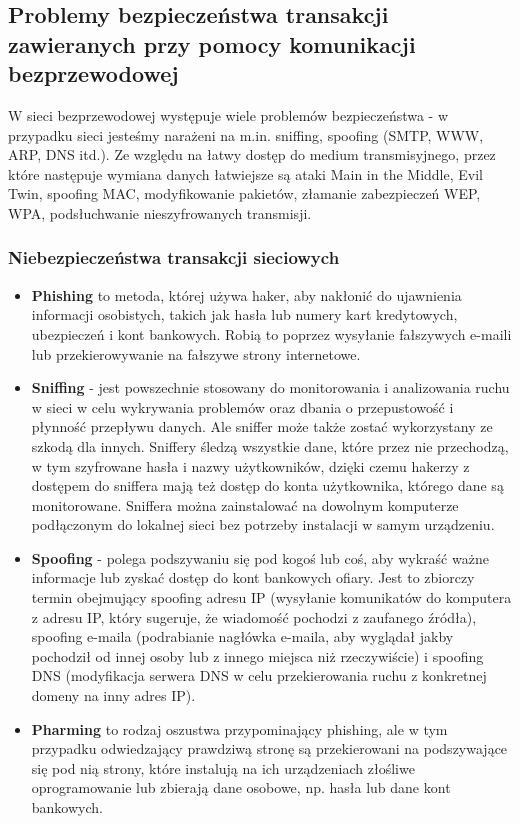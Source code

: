 \subsection{Problemy bezpieczeństwa transakcji zawieranych przy pomocy komunikacji bezprzewodowej}

W sieci bezprzewodowej występuje wiele problemów bezpieczeństwa - w przypadku sieci jesteśmy narażeni na m.in. sniffing, spoofing (SMTP, WWW, ARP, DNS itd.). Ze względu na łatwy dostęp do medium transmisyjnego, przez które następuje wymiana danych łatwiejsze są ataki Main in the Middle, Evil Twin, spoofing MAC, modyfikowanie pakietów, złamanie zabezpieczeń WEP, WPA, podsłuchwanie nieszyfrowanych transmisji.

\subsubsection{Niebezpieczeństwa transakcji sieciowych}

\begin{itemize}
	\item \textbf{Phishing} to metoda, której używa haker, aby nakłonić do ujawnienia informacji osobistych, takich jak hasła lub numery kart kredytowych, ubezpieczeń i kont bankowych. Robią to poprzez wysyłanie fałszywych e-maili lub przekierowywanie na fałszywe strony internetowe.
	\item \textbf{Sniffing} - jest powszechnie stosowany do monitorowania i analizowania ruchu w sieci w celu wykrywania problemów oraz dbania o przepustowość i płynność przepływu danych. Ale sniffer może także zostać wykorzystany ze szkodą dla innych. Sniffery śledzą wszystkie dane, które przez nie przechodzą, w tym szyfrowane hasła i nazwy użytkowników, dzięki czemu hakerzy z dostępem do sniffera mają też dostęp do konta użytkownika, którego dane są monitorowane. Sniffera można zainstalować na dowolnym komputerze podłączonym do lokalnej sieci bez potrzeby instalacji w samym urządzeniu.

	\item \textbf{Spoofing} - polega podszywaniu się pod kogoś lub coś, aby wykraść ważne informacje lub zyskać dostęp do kont bankowych ofiary. Jest to zbiorczy termin obejmujący spoofing adresu IP (wysyłanie komunikatów do komputera z adresu IP, który sugeruje, że wiadomość pochodzi z zaufanego źródła), spoofing e-maila (podrabianie nagłówka e-maila, aby wyglądał jakby pochodził od innej osoby lub z innego miejsca niż rzeczywiście) i spoofing DNS (modyfikacja serwera DNS w celu przekierowania ruchu z konkretnej domeny na inny adres IP).
	\item \textbf{Pharming} to rodzaj oszustwa przypominający phishing, ale w tym przypadku odwiedzający prawdziwą stronę są przekierowani na podszywające się pod nią strony, które instalują na ich urządzeniach złośliwe oprogramowanie lub zbierają dane osobowe, np. hasła lub dane kont bankowych. 
\end{itemize}

